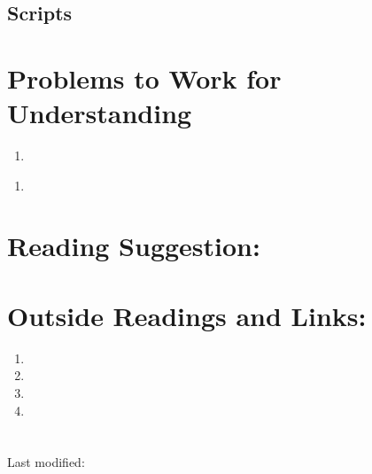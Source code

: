 \documentclass[12pt]{article}
\begin{document}
\subsection*{Scripts}



\hr

\section*{Problems to Work for Understanding}
\renewcommand{\theexerciseseries}{}
\renewcommand{\theexercise}{\arabic{exercise}}

\begin{exercise}
  
\end{exercise}
\begin{solution}
  
\end{solution}
\begin{exercise}
  \begin{enumerate}[label=(\alpha*)]
  \item 
  \end{enumerate}
\end{exercise}
\begin{solution}
  \begin{enumerate}[label=(\alpha*)]
  \item 
  \end{enumerate}
\end{solution}

\hr

\section*{Reading Suggestion:}




\hr

\section*{Outside Readings and Links:}
\begin{enumerate}
  \item  
  \item  
  \item  
  \item 
\end{enumerate}

\section*{\solutionsname}
\loadSolutions

\hr

\mydisclaim \myfooter

Last modified:  \flastmod
\end{document}
